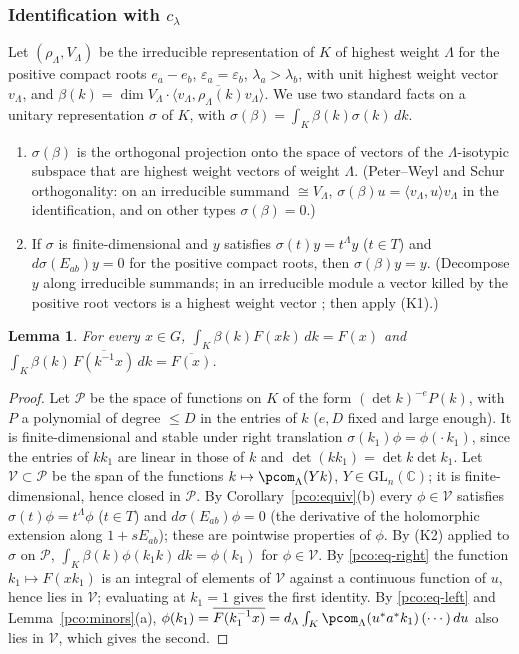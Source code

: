\documentclass[10pt]{amsart}
\newtheorem{lemma}[theorem]{Lemma}
\theoremstyle{definition}
\theoremstyle{remark}
\newcommand{\C}{\mathbb C}
\begin{document}
\subsubsection{Identification with $c_\lambda$}\label{pco:ss-ident}
Let $(\rho_\Lambda,V_\Lambda)$ be the irreducible representation of $K$ of highest weight $\Lambda$
for the positive compact roots $e_a-e_b$, $\varepsilon_a=\varepsilon_b$, $\lambda_a>\lambda_b$, with
unit highest weight vector $v_\Lambda$, and $\beta(k)=\dim V_\Lambda\cdot\overline{\langle v_\Lambda,
\rho_\Lambda(k)v_\Lambda\rangle}$. We use two standard facts on a unitary representation $\sigma$ of
$K$, with $\sigma(\beta)=\int_K\beta(k)\sigma(k)\,dk$.
\begin{enumerate}
\item[(K1)] $\sigma(\beta)$ is the orthogonal projection onto the space of vectors of the
$\Lambda$-isotypic subspace that are highest weight vectors of weight $\Lambda$. (Peter--Weyl and
Schur orthogonality: on an irreducible summand $\cong V_\Lambda$, $\sigma(\beta)u=\langle v_\Lambda,u
\rangle v_\Lambda$ in the identification, and on other types $\sigma(\beta)=0$.)
\item[(K2)] If $\sigma$ is finite-dimensional and $y$ satisfies $\sigma(t)y=t^\Lambda y$ ($t\in T$) and
$d\sigma(E_{ab})y=0$ for the positive compact roots, then $\sigma(\beta)y=y$. (Decompose $y$ along
irreducible summands; in an irreducible module a vector killed by the positive root vectors is a
highest weight vector \cite[Theorem~5.5(c), p.~279]{KnappBeyond}; then apply (K1).)
\end{enumerate}

\begin{lemma}\label{pco:Kfin}
For every $x\in G$, $\int_K\beta(k)F(xk)\,dk=F(x)$ and $\int_K\beta(k)\,\overline{F(k^{-1}x)}\,dk=
\overline{F(x)}$.
\end{lemma}
\begin{proof}
Let $\mathcal P$ be the space of functions on $K$ of the form $(\det k)^{-e}P(k)$, with $P$ a
polynomial of degree $\le D$ in the entries of $k$ ($e,D$ fixed and large enough). It is
finite-dimensional and stable under right translation $\sigma(k_1)\phi=\phi(\cdot\,k_1)$, since the
entries of $kk_1$ are linear in those of $k$ and $\det(kk_1)=\det k\det k_1$. Let $\mathcal
V\subset\mathcal P$ be the span of the functions $k\mapsto\pcom_\Lambda(Yk)$, $Y\in
\mathrm{GL}_n(\C)$; it is finite-dimensional, hence closed in $\mathcal P$. By
Corollary~\ref{pco:equiv}(b) every $\phi\in\mathcal V$ satisfies $\sigma(t)\phi=t^\Lambda\phi$
($t\in T$) and $d\sigma(E_{ab})\phi=0$ (the derivative of the holomorphic extension along
$1+sE_{ab}$); these are pointwise properties of $\phi$. By (K2) applied to $\sigma$ on $\mathcal P$,
$\int_K\beta(k)\phi(k_1k)\,dk=\phi(k_1)$ for $\phi\in\mathcal V$. By \eqref{pco:eq-right} the function
$k_1\mapsto F(xk_1)$ is an integral of elements of $\mathcal V$ against a continuous function of
$u$, hence lies in $\mathcal V$; evaluating at $k_1=1$ gives the first identity. By
\eqref{pco:eq-left} and Lemma~\ref{pco:minors}(a), $\phi(k_1)=\overline{F(k_1^{-1}x)}=d_\Lambda\int_K
\pcom_\Lambda(u^*a^*k_1)\,(\cdots)\,du$ also lies in $\mathcal V$, which gives the second.
\end{proof}
\end{document}
